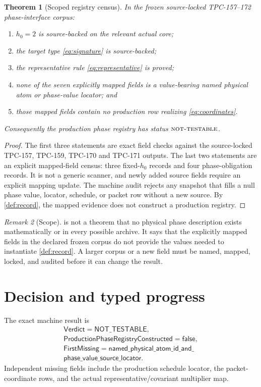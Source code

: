 \documentclass[11pt]{article}
\newtheorem{theorem}{Theorem}[section]
\theoremstyle{definition}
\theoremstyle{remark}
\newtheorem{remark}[theorem]{Remark}
\newcommand{\NT}{\textnormal{\textsc{not-testable}}}
\begin{document}
\begin{theorem}[Scoped registry census]
\label{thm:census}
In the frozen source-locked TPC-157--172 phase-interface corpus:
\begin{enumerate}[label=(\roman*),leftmargin=2.2em]
\item \(h_0=2\) is source-backed on the relevant actual core;
\item the target type \eqref{eq:signature} is source-backed;
\item the representative rule \eqref{eq:representative} is proved;
\item none of the seven explicitly mapped fields is a value-bearing
  named physical atom or phase-value locator; and
\item those mapped fields contain no production row realizing
  \eqref{eq:coordinates}.
\end{enumerate}
Consequently the production phase registry has status \(\NT\).
\end{theorem}

\begin{proof}
The first three statements are exact field checks against the
source-locked TPC-157, TPC-159, TPC-170 and TPC-171 outputs.  The last
two statements are an explicit mapped-field census: three
fixed-\(h_0\) records and four phase-obligation records.  It is not a
generic scanner, and newly added source fields require an explicit
mapping update.  The machine audit rejects any snapshot that fills a
null phase value, locator, schedule, or packet row without a new
source.  By \cref{def:record}, the mapped evidence does not construct
a production registry.
\end{proof}

\begin{remark}[Scope]
\label{rem:scope}
 is not a theorem that no physical phase description
exists mathematically or in every possible archive.  It says that the
explicitly mapped fields in the declared frozen corpus do not provide
the values needed to instantiate \cref{def:record}.  A larger corpus
or a new field must be named, mapped, locked, and audited before it can
change the result.
\end{remark}

\section{Decision and typed progress}

The exact machine result is
\[
\boxed{
\begin{gathered}
\mathsf{Verdict}=\mathsf{NOT\_TESTABLE},\\
\mathsf{ProductionPhaseRegistryConstructed}=\mathsf{false},\\
\mathsf{FirstMissing}=
\mathsf{named\_physical\_atom\_id\_and\_}\\[-2pt]
\mathsf{phase\_value\_source\_locator}.
\end{gathered}}
\tag{9}\label{eq:decision}
\]
Independent missing fields include the production schedule locator,
the packet-coordinate rows, and the actual representative/covariant
multiplier map.
\end{document}
